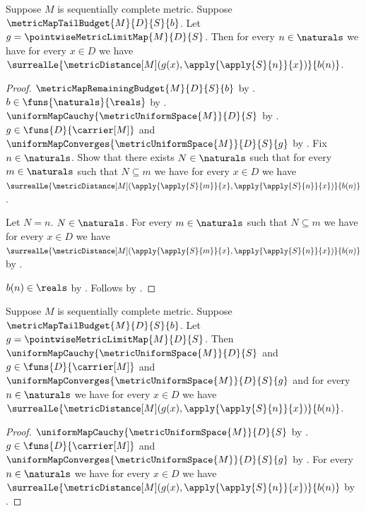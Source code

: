 \begin{theorem}\label{metric_map_limit_tail_bound}
    Suppose $M$ is sequentially complete metric.
    Suppose $\metricMapTailBudget{M}{D}{S}{b}$.
    Let $g=\pointwiseMetricLimitMap{M}{D}{S}$.
    Then for every $n\in\naturals$ we have for every $x\in D$ we have
        $\surrealLe{\metricDistance[M]
            (g(x),\apply{\apply{S}{n}}{x})}{b(n)}$.
\end{theorem}
\begin{proof}
    $\metricMapRemainingBudget{M}{D}{S}{b}$
        by .
    $b\in\funs{\naturals}{\reals}$
        by .
    $\uniformMapCauchy{\metricUniformSpace{M}}{D}{S}$
        by .
    $g\in\funs{D}{\carrier[M]}$ and
        $\uniformMapConverges{\metricUniformSpace{M}}{D}{S}{g}$
        by
        .
    Fix $n\in\naturals$.
    Show that there exists $N\in\naturals$ such that for every
        $m\in\naturals$ such that $N\subseteq m$ we have
        for every $x\in D$ we have
        $\surrealLe{\metricDistance[M]
            (\apply{\apply{S}{m}}{x},
             \apply{\apply{S}{n}}{x})}{b(n)}$.
    \begin{subproof}
        Let $N=n$.
        $N\in\naturals$.
        For every $m\in\naturals$ such that $N\subseteq m$ we have
            for every $x\in D$ we have
            $\surrealLe{\metricDistance[M]
                (\apply{\apply{S}{m}}{x},
                 \apply{\apply{S}{n}}{x})}{b(n)}$
            by .
    \end{subproof}
    $b(n)\in\reals$ by .
    Follows by .
\end{proof}

\begin{theorem}\label{metric_map_limit_from_tail_budget}
    Suppose $M$ is sequentially complete metric.
    Suppose $\metricMapTailBudget{M}{D}{S}{b}$.
    Let $g=\pointwiseMetricLimitMap{M}{D}{S}$.
    Then
        $\uniformMapCauchy{\metricUniformSpace{M}}{D}{S}$ and
        $g\in\funs{D}{\carrier[M]}$ and
        $\uniformMapConverges{\metricUniformSpace{M}}{D}{S}{g}$ and
        for every $n\in\naturals$ we have for every $x\in D$ we have
            $\surrealLe{\metricDistance[M]
                (g(x),\apply{\apply{S}{n}}{x})}{b(n)}$.
\end{theorem}
\begin{proof}
    $\uniformMapCauchy{\metricUniformSpace{M}}{D}{S}$
        by .
    $g\in\funs{D}{\carrier[M]}$ and
        $\uniformMapConverges{\metricUniformSpace{M}}{D}{S}{g}$
        by
        .
    For every $n\in\naturals$ we have for every $x\in D$ we have
        $\surrealLe{\metricDistance[M]
            (g(x),\apply{\apply{S}{n}}{x})}{b(n)}$
        by .
\end{proof}

